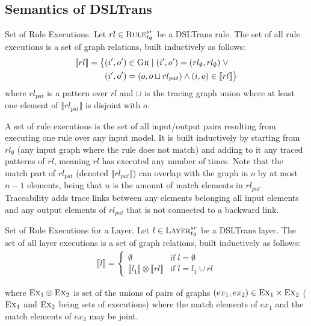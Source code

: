 \subsection{Semantics of DSLTrans}

\begin{definition}{Set of Rule Executions.}
\label{def:rule_exec_set}
Let $rl\in \textsc{Rule}^{sr}_{tg}$ be a DSLTrans rule. The set of all rule
executions is a set of graph relations, built inductively as follows:
\begin{align*}
\llbracket rl\rrbracket =\big\{&(i',o')\in \textsc{Gr}\;\lvert\;(i',o') =
(rl_{\emptyset},rl_{\emptyset})\;\lor \\&(i',o') = (o,o\sqcup rl_{pat})\land
(i,o)\in \llbracket rl\rrbracket \big\}
\end{align*} 
where  $rl_{pat}$ is a pattern over $rl$ and $\sqcup$
is the tracing graph union where at least one element of $\Vert rl_{pat}\Vert$
is disjoint with $o$.
\end{definition}

A set of rule executions is the set of all input/output pairs resulting from
executing one rule over any input model. It is built inductively by starting
from $rl_{\emptyset}$ (any input graph where the rule does not match) and adding
to it any traced patterns of $rl$, meaning $rl$ has executed any number of
times. Note that the match part of $rl_{pat}$ (denoted $\Vert rl_{pat}\Vert$)
can overlap with the graph in $o$ by at most $n-1$ elements, being that $n$ is the amount
of match elements in $rl_{pat}$. Traceability adds trace links between any
elements belonging all input elements and any output elements of $rl_{pat}$ that
is not connected to a backward link.


\begin{definition}{Set of Rule Executions for a Layer.}
\label{def:rule_exec_set}
Let $l\in \textsc{Layer}^{sr}_{tg}$ be a DSLTrans layer. The set of all layer
executions is a set of graph relations, built inductively as follows:
\begin{gather*}
  \llbracket l\rrbracket = 
  \begin{cases}
    \emptyset &\text{if}\; l=\emptyset\\
    \llbracket l_1\rrbracket \otimes \llbracket rl\rrbracket &\text{if}\;
    l = l_1\cup rl
  \end{cases}
\end{gather*}  

where $\textsc{Ex}_1 \otimes \textsc{Ex}_2$ is set of the unions of pairs of
graphs $(ex_1,ex_2)\in \textsc{Ex}_1 \times \textsc{Ex}_2$ ($\textsc{Ex}_1$ and
$\textsc{Ex}_2$ being sets of executions) where the match elements of $ex_1$ and
the match elements of $ex_2$ may be joint.
\end{definition}

